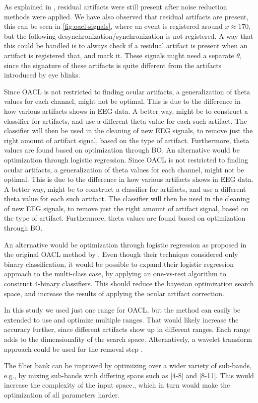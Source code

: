 As explained in \cite{hoffmann2008correction}, residual artifacts were still present after noise reduction methods were applied. We have also observed that residual artifacts are present, this can be seen in \cref{fig:oacl-signals}, where an event is registered around $x \approx 170$, but the following desynchronization/synchronization is not registered. A way that this could be handled is to always check if a residual artifact is present when an artifact is registered that, and mark it. These signals might need a separate $\theta$, since the signature of these artifacts is quite different from the artifacts introduced by eye blinks.

Since OACL is not restricted to finding ocular artifacts, a generalization of theta values for each channel, might not be optimal. This is due to the difference in how various artifacts shows in EEG data. A better way, might be to construct a classifier for artifacts, and use a different theta value for each such artifact. The classifier will then be used in the cleaning of new EEG signals, to remove just the right amount of artifact signal, based on the type of artifact. Furthermore, theta values are found based on optimization through BO. An alternative would be optimization through logistic regression. 
Since OACL is not restricted to finding ocular artifacts, a generalization of theta values for each channel, might not be optimal. This is due to the difference in how various artifacts shows in EEG data. A better way, might be to construct a classifier for artifacts, and use a different theta value for each such artifact. The classifier will then be used in the cleaning of new EEG signals, to remove just the right amount of artifact signal, based on the type of artifact. Furthermore, theta values are found based on optimization through BO.

An alternative would be optimization through logistic regression as proposed in the original OACL method by \citet{li2015ocular}. Even though their technique considered only binary classification, it would be possible to expand their logistic regression approach to the multi-class case, by applying an one-vs-rest algorithm to construct 4-binary classifiers. This should reduce the bayesian optimization search space, and increase the results of applying the ocular artifact correction.

In this study we used just one range for OACL, but the method can easily be extended to use and optimize multiple ranges. That would likely increase the accuracy further, since different artifacts show up in different ranges. Each range adds to the dimensionality of the search space. Alternatively, a wavelet transform approach could be used for the removal step \citep{krishnaveni2006automatic}.

The filter bank can be improved by optimizing over a wider variety of sub-bands, e.g., by mixing sub-bands with differing spans such as [4-8] and [8-11]. This would increase the complexity of the input space., which in turn would make the optimization of all parameters harder. 